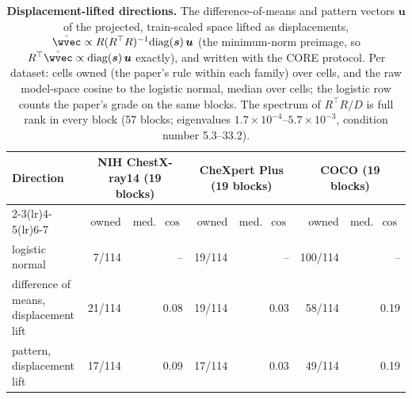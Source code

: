 \begin{table}[h]
\centering
\scriptsize
\setlength{\tabcolsep}{4pt}
\caption{\textbf{Displacement-lifted directions.} The difference-of-means and pattern vectors $\boldsymbol u$ of the projected, train-scaled space lifted as displacements, $\hat\wvec\propto R(R^{\top}R)^{-1}\mathrm{diag}(\boldsymbol s)\,\boldsymbol u$ (the minimum-norm preimage, so $R^{\top}\hat\wvec\propto\mathrm{diag}(\boldsymbol s)\,\boldsymbol u$ exactly), and written with the CORE protocol. Per dataset: cells owned (the paper's rule within each family) over cells, and the raw model-space cosine to the logistic normal, median over cells; the logistic row counts the paper's grade on the same blocks. The spectrum of $R^{\top}R/D$ is full rank in every block (57 blocks; eigenvalues $1.7\times10^{-4}$--$5.7\times10^{-3}$, condition number 5.3--33.2).}
\label{tab:cf-altdird}
\begin{tabular}{lrrrrrr}
\toprule
Direction & \multicolumn{2}{c}{NIH ChestX-ray14 (19 blocks)} & \multicolumn{2}{c}{CheXpert Plus (19 blocks)} & \multicolumn{2}{c}{COCO (19 blocks)} \\
\cmidrule(lr){2-3}\cmidrule(lr){4-5}\cmidrule(lr){6-7}
 & owned & med.\ $\cos$ & owned & med.\ $\cos$ & owned & med.\ $\cos$ \\
\midrule
logistic normal & 7/114 & -- & 19/114 & -- & 100/114 & -- \\
difference of means, displacement lift & 21/114 & 0.08 & 19/114 & 0.03 & 58/114 & 0.19 \\
pattern, displacement lift & 17/114 & 0.09 & 17/114 & 0.03 & 49/114 & 0.19 \\
\bottomrule
\end{tabular}
\end{table}
